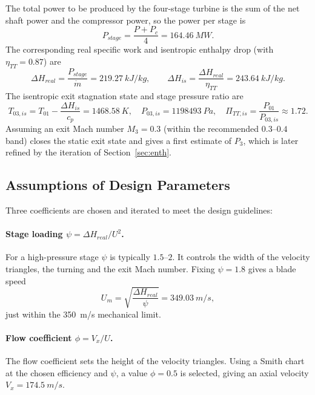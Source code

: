 The total power to be produced by the four-stage turbine is the sum of the net
shaft power and the compressor power, so the power per stage is
\begin{equation}
    P_{stage} = \frac{P + P_c}{4} = \SI{164.46}{MW}.
\end{equation}
The corresponding real specific work and isentropic enthalpy drop
(with $\eta_{TT}=0.87$) are
\begin{equation}
    \Delta H_{real} = \frac{P_{stage}}{\dot m} = \SI{219.27}{kJ/kg},\qquad
    \Delta H_{is} = \frac{\Delta H_{real}}{\eta_{TT}} = \SI{243.64}{kJ/kg}.
\end{equation}
The isentropic exit stagnation state and stage pressure ratio are
\begin{equation}
    T_{03,is} = T_{01}-\frac{\Delta H_{is}}{c_p} = \SI{1468.58}{K},\quad
    P_{03,is} = \SI{1198493}{Pa},\quad
    \Pi_{TT,is} = \frac{P_{01}}{P_{03,is}} \approx 1.72 .
\end{equation}
Assuming an exit Mach number $M_3 = 0.3$ (within the recommended $0.3$--$0.4$
band) closes the static exit state and gives a first estimate of $P_3$, which is
later refined by the iteration of Section~\ref{sec:enth}.

\subsection{Assumptions of Design Parameters}

Three coefficients are chosen and iterated to meet the design guidelines:

\paragraph{Stage loading $\psi = \Delta H_{real}/U^2$.}
For a high-pressure stage $\psi$ is typically $1.5$--$2$. It controls the width
of the velocity triangles, the turning and the exit Mach number. Fixing
$\psi = 1.8$ gives a blade speed
\begin{equation}
    U_m = \sqrt{\frac{\Delta H_{real}}{\psi}} = \SI{349.03}{m/s},
\end{equation}
just within the \SI{350}{m/s} mechanical limit.

\paragraph{Flow coefficient $\phi = V_x/U$.}
The flow coefficient sets the height of the velocity triangles. Using a Smith
chart~\cite{smith} at the chosen efficiency and $\psi$, a value $\phi = 0.5$ is
selected, giving an axial velocity $V_x = \SI{174.5}{m/s}$.

